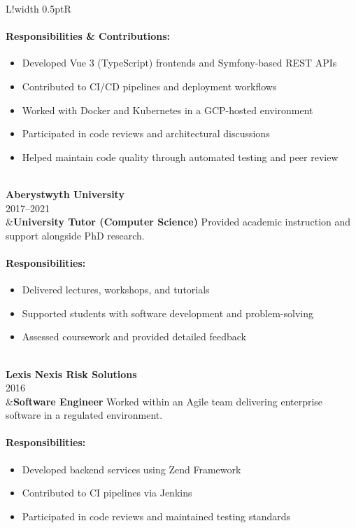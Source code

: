 \documentclass[10pt]{article}
\newcommand\VRule{\color{lightgray}\vrule width 0.5pt}
\begin{document}
\begin{longtable}{L!{\VRule}R}
\paragraph{Responsibilities \& Contributions:}
\begin{itemize}[noitemsep,topsep=0pt]
    \item Developed Vue 3 (TypeScript) frontends and Symfony-based REST APIs
    \item Contributed to CI/CD pipelines and deployment workflows
    \item Worked with Docker and Kubernetes in a GCP-hosted environment
    \item Participated in code reviews and architectural discussions
    \item Helped maintain code quality through automated testing and peer review
\end{itemize}
\\

{\bf Aberystwyth University}\\
2017--2021\\
&{\bf University Tutor (Computer Science)}\newline
Provided academic instruction and support alongside PhD research.

\vspace{-3mm}
\paragraph{Responsibilities:}
\begin{itemize}[noitemsep,topsep=0pt]
    \item Delivered lectures, workshops, and tutorials
    \item Supported students with software development and problem-solving
    \item Assessed coursework and provided detailed feedback
\end{itemize}
\\

{\bf Lexis Nexis Risk Solutions}\\
2016\\
&{\bf Software Engineer}\newline
Worked within an Agile team delivering enterprise software in a regulated environment.

\vspace{-3mm}
\paragraph{Responsibilities:}
\begin{itemize}[noitemsep,topsep=0pt]
    \item Developed backend services using Zend Framework
    \item Contributed to CI pipelines via Jenkins
    \item Participated in code reviews and maintained testing standards
\end{itemize}
\end{longtable}
\end{document}
